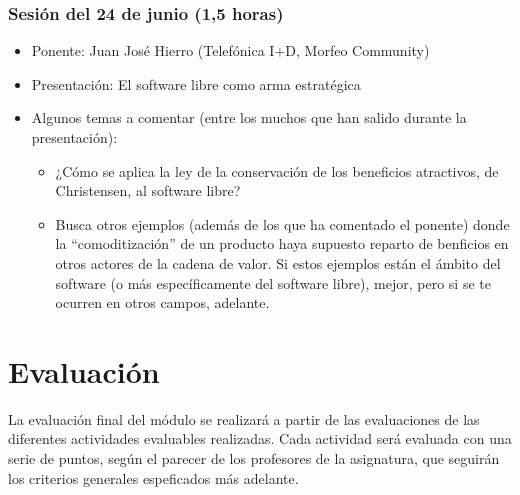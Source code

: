 \documentclass[a4paper,12pt]{article}
\begin{document}


\subsubsection{Sesión del 24 de junio (1,5 horas)}

\begin{itemize}
\item Ponente: Juan José Hierro (Telefónica I+D, Morfeo Community)
\item Presentación: El software libre como arma estratégica
\item Algunos temas a comentar (entre los muchos que han salido durante la presentación): 
  \begin{itemize}
  \item ¿Cómo se aplica la ley de la conservación de los beneficios atractivos, de Christensen, al software libre?
  \item Busca otros ejemplos (además de los que ha comentado el ponente) donde la ``comoditización'' de un producto haya supuesto reparto de benficios en otros actores de la cadena de valor. Si estos ejemplos están el ámbito del software (o más específicamente del software libre), mejor, pero si se te ocurren en otros campos, adelante.
  \end{itemize}
\end{itemize}


\section{Evaluación}

La evaluación final del módulo se realizará a partir de las evaluaciones de las diferentes actividades evaluables realizadas. Cada actividad será evaluada con una serie de puntos, según el parecer de los profesores de la asignatura, que seguirán los criterios generales espeficados más adelante.
\end{document}
